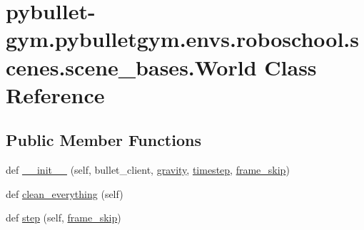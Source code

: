\hypertarget{classpybullet-gym_1_1pybulletgym_1_1envs_1_1roboschool_1_1scenes_1_1scene__bases_1_1_world}{}\section{pybullet-\/gym.pybulletgym.\+envs.\+roboschool.\+scenes.\+scene\+\_\+bases.\+World Class Reference}
\label{classpybullet-gym_1_1pybulletgym_1_1envs_1_1roboschool_1_1scenes_1_1scene__bases_1_1_world}
\subsection*{Public Member Functions}
\begin{DoxyCompactItemize}
\item 
def \hyperlink{classpybullet-gym_1_1pybulletgym_1_1envs_1_1roboschool_1_1scenes_1_1scene__bases_1_1_world_ad758aff1af8181480f296ec169b0a4b9}{\+\_\+\+\_\+init\+\_\+\+\_\+} (self, bullet\+\_\+client, \hyperlink{classpybullet-gym_1_1pybulletgym_1_1envs_1_1roboschool_1_1scenes_1_1scene__bases_1_1_world_acc2e5f12a8aaed3c144d0fd385491bff}{gravity}, \hyperlink{classpybullet-gym_1_1pybulletgym_1_1envs_1_1roboschool_1_1scenes_1_1scene__bases_1_1_world_a1bafc4a95fd93937b04a5b88acfc4759}{timestep}, \hyperlink{classpybullet-gym_1_1pybulletgym_1_1envs_1_1roboschool_1_1scenes_1_1scene__bases_1_1_world_ae54e7d6901efb3bafc130a65e910907e}{frame\+\_\+skip})
\item 
def \hyperlink{classpybullet-gym_1_1pybulletgym_1_1envs_1_1roboschool_1_1scenes_1_1scene__bases_1_1_world_a3a1d9a072053cf78f95e1d569d84c960}{clean\+\_\+everything} (self)
\item 
def \hyperlink{classpybullet-gym_1_1pybulletgym_1_1envs_1_1roboschool_1_1scenes_1_1scene__bases_1_1_world_a38ea960b0336aff24c4458d905748494}{step} (self, \hyperlink{classpybullet-gym_1_1pybulletgym_1_1envs_1_1roboschool_1_1scenes_1_1scene__bases_1_1_world_ae54e7d6901efb3bafc130a65e910907e}{frame\+\_\+skip})
\end{DoxyCompactItemize}

